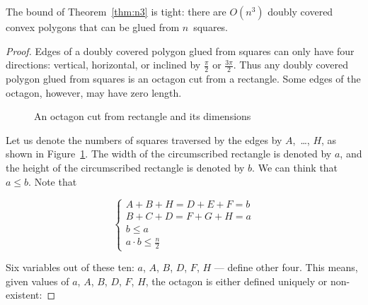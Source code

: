 \documentclass[a4paper,11pt]{article}
\begin{document}
\begin{theorem}
	The bound of Theorem~\ref{thm:n3} is tight: there are $O(n^3)$ doubly covered convex polygons that can be glued from $n$~squares.
\end{theorem}

\begin{proof} Edges of a doubly covered polygon glued from squares can only have four directions: vertical, horizontal, or inclined by $\frac{\pi}{2}$ or $\frac{3\pi}{2}$. Thus any doubly covered polygon glued from squares is an octagon cut from a rectangle. Some edges of the octagon, however, may have zero length.

\begin{figure}[h] \centering {}
	\caption{An octagon cut from rectangle and its dimensions}
	\label{fig:octparam}
\end{figure}

Let us denote the numbers of squares traversed by the edges by $A$,~\ldots, $H$, as shown in Figure~\ref{fig:octparam}. The width of the circumscribed rectangle is denoted by $a$, and the height of the circumscribed rectangle is denoted by $b$. We can think that $a \le b$. Note that

\[ \begin{cases}
	A+B+H = D+E+F = b \\
	B+C+D = F+G+H = a \\
	b \le a\\ a \cdot b \le \frac{n}{2}
\end{cases} \]

Six variables out of these ten: $a$, $A$, $B$, $D$, $F$, $H$ — define other four. This means, given values of $a$, $A$, $B$, $D$, $F$, $H$, the octagon is either defined uniquely or non-existent:


\end{proof}
\end{document}
